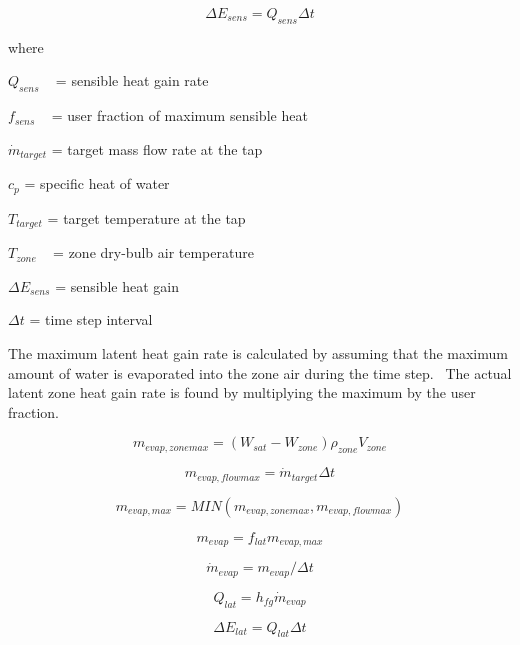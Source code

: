 \begin{equation}
\Delta {E_{sens}} = {Q_{sens}}\Delta t
\end{equation}

where

\({Q_{sens}}\) ~ = sensible heat gain rate

\({f_{sens}}\) ~ = user fraction of maximum sensible heat

\({\dot m_{target}}\) = target mass flow rate at the tap

\({c_p}\) = specific heat of water

\({T_{target}}\) = target temperature at the tap

\({T_{zone}}\) ~ = zone dry-bulb air temperature

\(\Delta {E_{sens}}\) = sensible heat gain

\(\Delta t\) = time step interval

The maximum latent heat gain rate is calculated by assuming that the maximum amount of water is evaporated into the zone air during the time step.~ The actual latent zone heat gain rate is found by multiplying the maximum by the user fraction.

\begin{equation}
{m_{evap,zonemax}} = \left( {{W_{sat}} - {W_{zone}}} \right){\rho_{zone}}{V_{zone}}
\end{equation}

\begin{equation}
{m_{evap,flowmax}} = {\dot m_{target}}\Delta t
\end{equation}

\begin{equation}
{m_{evap,max}} = MIN({m_{evap,zonemax}},{m_{evap,flowmax}})
\end{equation}

\begin{equation}
{m_{evap}} = {f_{lat}}{m_{evap,max}}
\end{equation}

\begin{equation}
{\dot m_{evap}} = {m_{evap}}/\Delta t
\end{equation}

\begin{equation}
{Q_{lat}} = {h_{fg}}{\dot m_{evap}}
\end{equation}

\begin{equation}
\Delta {E_{lat}} = {Q_{lat}}\Delta t
\end{equation}

